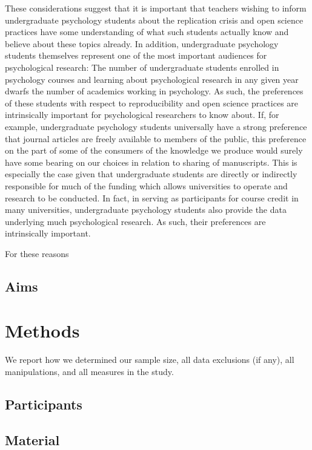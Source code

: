 \documentclass[
  english,
  man,mask,floatsintext]{apa6}
\begin{document}
These considerations suggest that it is important that teachers wishing to inform undergraduate psychology students about the replication crisis and open science practices have some understanding of what such students actually know and believe about these topics already. In addition, undergraduate psychology students themselves represent one of the most important audiences for psychological research: The number of undergraduate students enrolled in psychology courses and learning about psychological research in any given year dwarfs the number of academics working in psychology. As such, the preferences of these students with respect to reproducibility and open science practices are intrinsically important for psychological researchers to know about. If, for example, undergraduate psychology students universally have a strong preference that journal articles are freely available to members of the public, this preference on the part of some of the consumers of the knowledge we produce would surely have some bearing on our choices in relation to sharing of manuscripts. This is especially the case given that undergraduate students are directly or indirectly responsible for much of the funding which allows universities to operate and research to be conducted. In fact, in serving as participants for course credit in many universities, undergraduate psychology students also provide the data underlying much psychological research. As such, their preferences are intrinsically important.

For these reasons

\hypertarget{aims}{%
\subsection{Aims}\label{aims}}

\hypertarget{methods}{%
\section{Methods}\label{methods}}

We report how we determined our sample size, all data exclusions (if any), all manipulations, and all measures in the study.

\hypertarget{participants}{%
\subsection{Participants}\label{participants}}

\hypertarget{material}{%
\subsection{Material}\label{material}}
\end{document}
